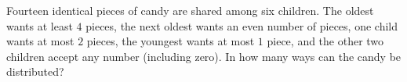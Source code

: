 Fourteen identical pieces of candy are shared among six children. The oldest wants at least $4$ pieces, the next oldest wants an even number of pieces, one child wants at most $2$ pieces, the youngest wants at most $1$ piece, and the other two children accept any number (including zero). In how many ways can the candy be distributed?
